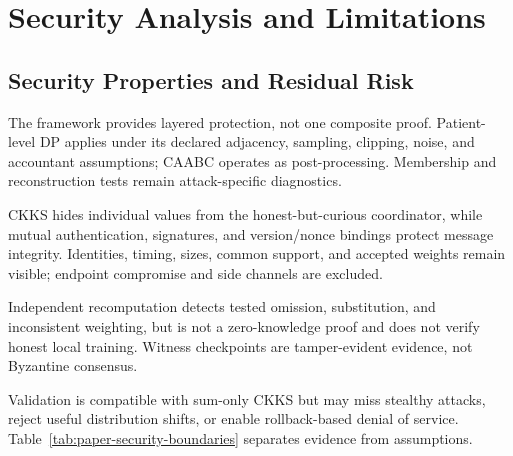 \documentclass[conference]{IEEEtran}
\begin{document}
\section{Security Analysis and Limitations}
\label{sec:limitations}

\subsection{Security Properties and Residual Risk}

The framework provides layered protection, not one composite proof. Patient-level
DP applies under its declared adjacency, sampling, clipping, noise, and
accountant assumptions; CAABC operates as post-processing. Membership and
reconstruction tests remain attack-specific diagnostics.

CKKS hides individual values from the honest-but-curious coordinator, while
mutual authentication, signatures, and version/nonce bindings protect message
integrity. Identities, timing, sizes, common support, and accepted weights remain
visible; endpoint compromise and side channels are excluded.

Independent recomputation detects tested omission, substitution, and inconsistent
weighting, but is not a zero-knowledge proof and does not verify honest local
training. Witness checkpoints are tamper-evident evidence, not Byzantine
consensus.

Validation is compatible with sum-only CKKS but may miss stealthy attacks,
reject useful distribution shifts, or enable rollback-based denial of service.
Table~\ref{tab:paper-security-boundaries} separates evidence from assumptions.
\end{document}
